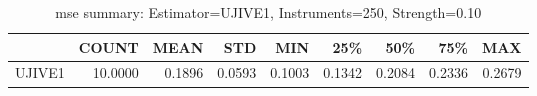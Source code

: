 \begin{table}[ht]
\centering
\caption{mse summary: Estimator=UJIVE1, Instruments=250, Strength=0.10}
\begin{tabular}{lrrrrrrrr}
\toprule
 & COUNT & MEAN & STD & MIN & 25\% & 50\% & 75\% & MAX \\
\midrule
UJIVE1 & 10.0000 & 0.1896 & 0.0593 & 0.1003 & 0.1342 & 0.2084 & 0.2336 & 0.2679 \\
\bottomrule
\end{tabular}
\end{table}
